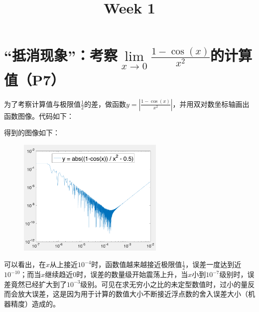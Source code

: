 \documentclass{homework}
\title{Week 1}
\date{}
\begin{document}
\maketitle
\section{“抵消现象”：考察$\lim\limits_{x\to0} \frac{1-\cos(x)}{x^2}$的计算值（P7）}
    为了考察计算值与极限值$\frac{1}{2}$的差，做函数$y=|\frac{1-\cos(x)}{x^2}|$，并用双对数坐标轴画出函数图像。代码如下：
    
    得到的图像如下：
    \begin{figure}[H]
    \includegraphics[width=7cm]{fig01.png}
    \centering
    \end{figure}
    可以看出，在$x$从上接近$10^{-4}$时，函数值越来越接近极限值$\frac{1}{2}$，误差一度达到近$10^{-10}$；而当$x$继续趋近0时，误差的数量级开始震荡上升，当$x$小到$10^{-7}$级别时，误差竟然已经扩大到了$10^{-3}$级别。可见在求无穷小之比的未定型数值时，过小的量反而会放大误差，这是因为用于计算的数值大小不断接近浮点数的舍入误差大小（机器精度）造成的。
    \clearpage
\end{document}

